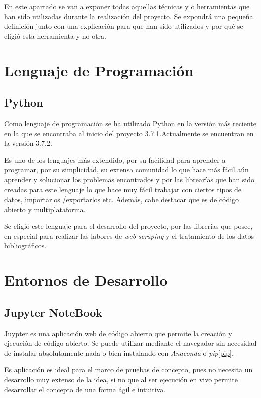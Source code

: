 
En este apartado se van a exponer todas aquellas técnicas y o herramientas que han sido utilizadas durante la realización del proyecto. Se expondrá una pequeña definición junto con una explicación para que han sido utilizados y por qué se eligió esta herramienta y no otra.

\section{Lenguaje de Programación}
\subsection{Python}
Como lenguaje de programación se ha utilizado \href {https://www.python.org/}{Python} en la versión más reciente en la que se encontraba al inicio del proyecto 3.7.1.Actualmente se encuentran en la versión 3.7.2. 

Es uno de los lenguajes más extendido, por su facilidad para aprender a programar, por su simplicidad, su extensa comunidad lo que hace más fácil aún aprender y solucionar los problemas encontrados y por las librearías que han sido creadas para este lenguaje lo que hace muy fácil trabajar con ciertos tipos de datos, importarlos /exportarlos etc. Además, cabe destacar que es de código abierto y multiplataforma\cite{python}.

Se eligió este lenguaje para el desarrollo del proyecto, por las librerías que posee, en especial para realizar las labores de \emph{web scraping} y el tratamiento de los datos bibliográficos.

\section{Entornos de Desarrollo}
\subsection{Jupyter NoteBook} 

\href{https://jupyter.org/}{Juypter} es una aplicación web de código abierto que permite la creación y ejecución de código abierto. Se puede utilizar mediante el navegador sin necesidad de instalar absolutamente nada o bien instalando con \emph{Anaconda} o \emph{pip}\ref{pip}.

Es aplicación es ideal para el marco de pruebas de concepto, pues no necesita un desarrollo muy extenso de la idea, si no que al ser ejecución en vivo permite desarrollar el concepto de una forma ágil e intuitiva\cite{jupyter}.

